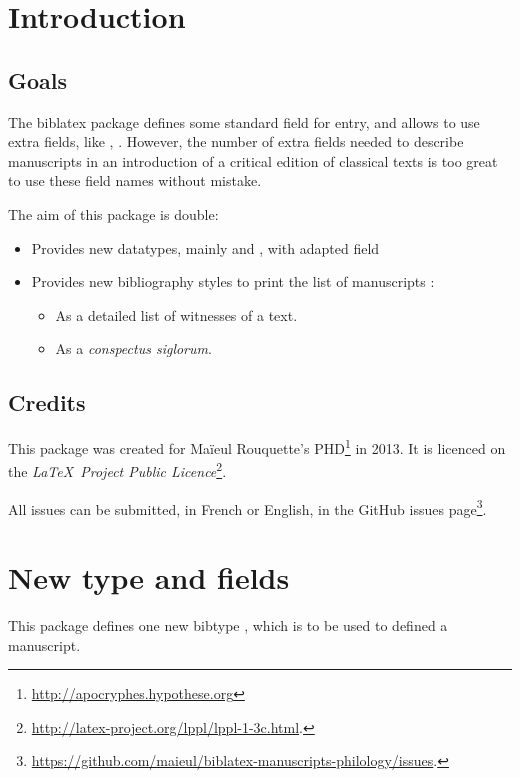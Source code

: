 \documentclass{ltxdockit}[2011/03/25]
\newcommand{\biblatex}{biblatex\xspace}
\begin{document}
\printtitlepage

\section{Introduction}
\subsection{Goals}
The \biblatex package defines some standard field for entry, and allows to use extra fields, like , . However, the number of extra fields needed to describe manuscripts in an introduction of a critical edition of classical texts is too great to use these field names without mistake.

The aim of this package is double:

\begin{itemize}
\item Provides new datatypes, mainly  and , with adapted field
\item Provides new bibliography styles to print the list of manuscripts :
\begin{itemize}
	\item As a detailed list of witnesses of a text.
	\item As a \emph{conspectus siglorum}.
\end{itemize}
\end{itemize}

\subsection{Credits}

This package was created for Maïeul Rouquette's PHD\footnote{\url{http://apocryphes.hypothese.org}} in 2013. It is licenced on the \emph{\LaTeX\ Project Public Licence}\footnote{\url{http://latex-project.org/lppl/lppl-1-3c.html}.}.

All issues can be submitted, in French or English, in the GitHub issues page\footnote{\url{https://github.com/maieul/biblatex-manuscripts-philology/issues}.}.


\section{New type and fields}

This package defines one new bibtype , which is to be used to defined a manuscript.
\end{document}
